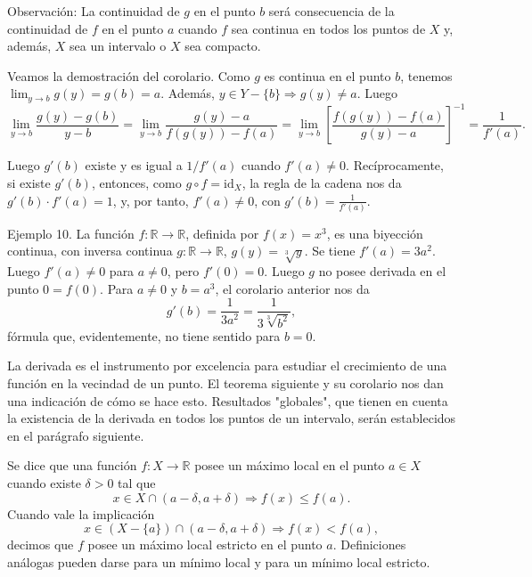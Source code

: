 \documentclass[12pt,oneside]{book}
\begin{document}
Observación: La continuidad de \( g \) en el punto \( b \) será consecuencia de la continuidad de \( f \) en el punto \( a \) cuando \( f \) sea continua en todos los puntos de \( X \) y, además, \( X \) sea un intervalo o \( X \) sea compacto.

Veamos la demostración del corolario. Como \( g \) es continua en el punto \( b \), tenemos \( \lim_{y \to b} g(y) = g(b) = a \). Además, \( y \in Y - \{b\} \Rightarrow g(y) \neq a \). Luego
\[
\lim_{y \to b} \frac{g(y) - g(b)}{y - b}
= \lim_{y \to b} \frac{g(y) - a}{f(g(y)) - f(a)}
= \lim_{y \to b} \left[ \frac{f(g(y)) - f(a)}{g(y) - a} \right]^{-1}
= \frac{1}{f'(a)}.
\]

Luego \( g'(b) \) existe y es igual a \( 1/f'(a) \) cuando \( f'(a) \neq 0 \). Recíprocamente, si existe \( g'(b) \), entonces, como \( g \circ f = \text{id}_X \), la regla de la cadena nos da \( g'(b) \cdot f'(a) = 1 \), y, por tanto, \( f'(a) \neq 0 \), con \( g'(b) = \frac{1}{f'(a)} \).

Ejemplo 10. La función \( f: \mathbb{R} \to \mathbb{R} \), definida por \( f(x) = x^3 \), es una biyección continua, con inversa continua \( g: \mathbb{R} \to \mathbb{R} \), \( g(y) = \sqrt[3]{y} \). Se tiene \( f'(a) = 3a^2 \). Luego \( f'(a) \neq 0 \) para \( a \neq 0 \), pero \( f'(0) = 0 \). Luego \( g \) no posee derivada en el punto \( 0 = f(0) \). Para \( a \neq 0 \) y \( b = a^3 \), el corolario anterior nos da
\[
g'(b) = \frac{1}{3a^2} = \frac{1}{3\sqrt[3]{b^2}},
\]
fórmula que, evidentemente, no tiene sentido para \( b = 0 \).

La derivada es el instrumento por excelencia para estudiar el crecimiento de una función en la vecindad de un punto. El teorema siguiente y su corolario nos dan una indicación de cómo se hace esto. Resultados "globales", que tienen en cuenta la existencia de la derivada en todos los puntos de un intervalo, serán establecidos en el parágrafo siguiente.

Se dice que una función \( f: X \to \mathbb{R} \) posee un máximo local en el punto \( a \in X \) cuando existe \( \delta > 0 \) tal que
\[
x \in X \cap (a - \delta, a + \delta) \Rightarrow f(x) \leq f(a).
\]
Cuando vale la implicación
\[
x \in (X - \{a\}) \cap (a - \delta, a + \delta) \Rightarrow f(x) < f(a),
\]
decimos que \( f \) posee un máximo local estricto en el punto \( a \). Definiciones análogas pueden darse para un mínimo local y para un mínimo local estricto.
\end{document}
